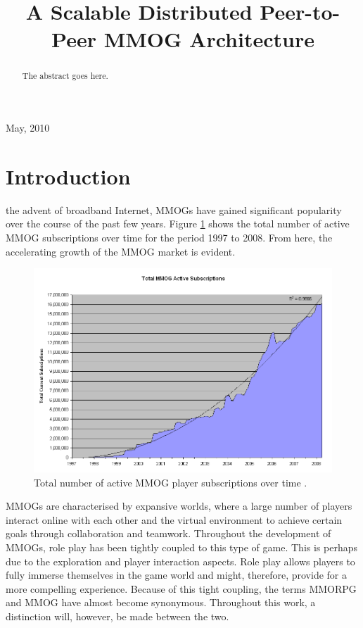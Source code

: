 \documentclass[journal,oneside,a4paper,onecolumn]{IEEEtran}
\begin{document}
%
\title{A Scalable Distributed Peer-to-Peer MMOG Architecture}

\author{
}

\maketitle

\begin{abstract}
The abstract goes here.
\end{abstract}

\hfill May, 2010

\section{Introduction}


 the advent of broadband Internet, \acp{MMOG} have gained significant popularity over the course of the past few years.
Figure \ref{fig_mmog_subscriptions} shows the total number of active MMOG subscriptions over time for the period 1997 to 2008. From here, the accelerating growth of the MMOG market is evident.
%
\begin{figure}[htbp]
 \centering
 \includegraphics[width=0.5\columnwidth]{MMOG_subscriptions}
 \caption{Total number of active MMOG player subscriptions over time \cite{mmo_growth_chart}.}
 \label{fig_mmog_subscriptions}
\end{figure}

\acp{MMOG} are characterised by expansive worlds, where a large number of players interact online with each other and the virtual environment to achieve certain goals through collaboration and teamwork. Throughout the development of \acp{MMOG}, role play has been tightly coupled to this type of game. This is perhaps due to the exploration and player interaction aspects. Role play allows players to fully immerse themselves in the game world and might, therefore, provide for a more compelling experience. Because of this tight coupling, the terms \ac{MMORPG} and \ac{MMOG} have almost become synonymous. Throughout this work, a distinction will, however, be made between the two.
\end{document}
